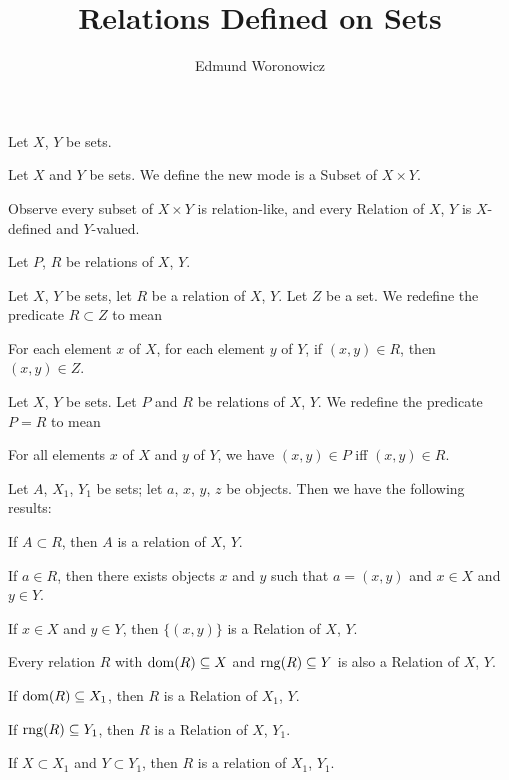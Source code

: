 \documentclass{article}
\title{Relations Defined on Sets}
\author{Edmund Woronowicz}
\begin{document}
\maketitle

Let $X$, $Y$ be sets.

\begin{definition}
Let $X$ and $Y$ be sets. We define the new mode 
is a Subset of $X\times Y$.
\end{definition}

Observe every subset of $X\times Y$ is relation-like, and every Relation
of $X$, $Y$ is $X$-defined and $Y$-valued.

Let $P$, $R$ be relations of $X$, $Y$.

\begin{definition}
Let $X$, $Y$ be sets, let $R$ be a relation of $X$, $Y$. Let $Z$ be a set.
We redefine the predicate $R\subset Z$ to mean
\begin{defn}
\item For each element $x$ of $X$, for each element $y$ of $Y$, if
  $(x,y)\in R$, then $(x,y)\in Z$.
\end{defn}
\end{definition}

\begin{definition}
Let $X$, $Y$ be sets. Let $P$ and $R$ be relations of $X$, $Y$.
We redefine the predicate $P=R$ to mean
\begin{defn}
\item For all elements $x$ of $X$ and $y$ of $Y$, we have $(x,y)\in P$
  iff $(x,y)\in R$.
\end{defn}
\end{definition}


Let $A$, $X_{1}$, $Y_{1}$ be sets; let $a$, $x$, $y$, $z$ be objects. Then we have the following results:
\begin{thm}
\item\label{relset1:1} If $A\subset R$, then $A$ is a relation of $X$, $Y$.
\item\label{relset1:2} If $a\in R$, then there exists objects $x$ and
  $y$ such that $a=(x,y)$ and $x\in X$ and $y\in Y$.
\item\label{relset1:3} If $x\in X$ and $y\in Y$, then $\{(x,y)\}$ is a
  Relation of $X$, $Y$.
\item\label{relset1:4} Every relation $R$ with $\operatorname{dom}(R)\subseteq X$ and
  $\operatorname{rng}(R)\subseteq Y$ is also a Relation of $X$, $Y$.
\item\label{relset1:5} If $\operatorname{dom}(R)\subseteq X_{1}$, then $R$ is a Relation
  of $X_{1}$, $Y$.
\item\label{relset1:6} If $\operatorname{rng}(R)\subseteq Y_{1}$, then $R$ is a Relation
  of $X$, $Y_{1}$.
\item\label{relset1:7} If $X\subset X_{1}$ and $Y\subset Y_{1}$, then
  $R$ is a relation of $X_{1}$, $Y_{1}$.
\end{thm}
\end{document}
